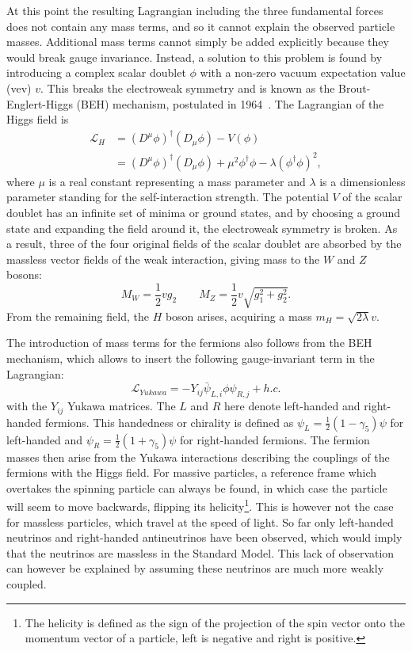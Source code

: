 At this point the resulting Lagrangian including the three fundamental forces does not contain any mass terms, and so it cannot explain the observed particle masses. Additional mass terms cannot simply be added explicitly because they would break gauge invariance. Instead, a solution to this problem is found by introducing a complex scalar doublet $\phi$ with a non-zero vacuum expectation value (vev) $v$. This breaks the electroweak symmetry and is known as the Brout-Englert-Higgs (BEH) mechanism, postulated in 1964~\cite{Englert:1964et,Higgs:1964pj, Guralnik:1964eu}. The Lagrangian of the Higgs field is
 \begin{align}
   \mathcal{L}_H &= (D^{\mu}\phi)^{\dagger}(D_{\mu}\phi) - V(\phi)\nonumber\\
   &= (D^{\mu}\phi)^{\dagger}(D_{\mu}\phi) +\mu^2\phi^{\dagger}\phi - \lambda(\phi^{\dagger}\phi)^2,
 \end{align}
where $\mu$ is a real constant representing a mass parameter and $\lambda$ is a dimensionless parameter standing for the self-interaction strength. The potential $V$ of the scalar doublet has an infinite set of minima or ground states, and by choosing a ground state and expanding the field around it, the electroweak symmetry is broken. As a result, three of the four original fields of the scalar doublet are absorbed by the massless vector fields of the weak interaction, giving mass to the $W$ and $Z$ bosons:
\begin{equation}
 M_W = \frac{1}{2}vg_2 \qquad M_Z = \frac{1}{2}v\sqrt{g_1^2 + g_2^2}.
\end{equation}
From the remaining field, the $H$ boson arises, acquiring a mass $m_H = \sqrt{2\lambda} v$.

The introduction of mass terms for the fermions also follows from the BEH mechanism, which allows to insert the following gauge-invariant term in the Lagrangian:
\begin{equation}
  \mathcal{L}_{Yukawa} = -Y_{ij}\bar{\psi}_{L,i}\phi\psi_{R,j} + h.c.
\end{equation}
with the $Y_{ij}$ Yukawa matrices. The $L$ and $R$ here denote left-handed and right-handed fermions. This handedness or chirality is defined as $\psi_{L} = \frac{1}{2}(1-\gamma_5)\psi$ for left-handed and $\psi_{R} = \frac{1}{2}(1+\gamma_5)\psi$ for right-handed fermions. The fermion masses then arise from the Yukawa interactions describing the couplings of the fermions with the Higgs field. For massive particles, a reference frame which overtakes the spinning particle can always be found, in which case the particle will seem to move backwards, flipping its helicity\footnote{The helicity is defined as the sign of the projection of the spin vector onto the momentum vector of a particle, left is negative and right is positive.}. This is however not the case for massless particles, which travel at the speed of light. So far only left-handed neutrinos and right-handed antineutrinos have been observed, which would imply that the neutrinos are massless in the Standard Model. This lack of observation can however be explained by assuming these neutrinos are much more weakly coupled.

